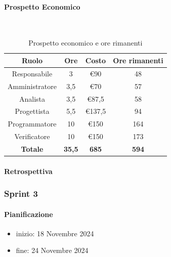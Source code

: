\documentclass{article}
\begin{document}
                \paragraph{Prospetto Economico}\mbox{}\\
                \begin{table}[H]
                    \centering
                    \begin{tabular}{|c|c|c|c|}
                    \hline
                    \textbf{Ruolo}  & \textbf{Ore}  & \textbf{Costo} & \textbf{Ore rimanenti} \\ \hline
                    Responsabile    & 3             & €90            & 48                     \\ \hline
                    Amministratore  & 3,5           & €70            & 57                   \\ \hline
                    Analista        & 3,5           & €87,5          & 58                   \\ \hline
                    Progettista     & 5,5           & €137,5         & 94                   \\ \hline
                    Programmatore   & 10            & €150           & 164                    \\ \hline
                    Verificatore    & 10            & €150           & 173                    \\ \hline
                    \textbf{Totale} & \textbf{35,5} & \textbf{685}   & \textbf{594}         \\ \hline
                    \end{tabular}
                    \caption{Prospetto economico e ore rimanenti}
                \end{table}

                \paragraph{Retrospettiva}
            \subsubsection{Sprint 3}
                \paragraph{Pianificazione}
                \begin{itemize}
                    \item inizio: 18 Novembre 2024
                    \item fine: 24 Novembre 2024
                \end{itemize}
\end{document}

